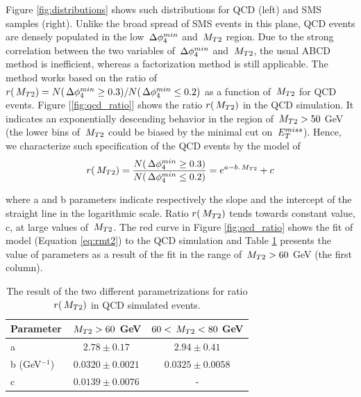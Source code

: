 Figure \ref{fig:distributions} shows such distributions for QCD (left) and SMS samples (right).
Unlike the broad spread of SMS events in this plane, QCD events are densely populated 
in the low $\,{\Delta\phi_{4}^{min}}$ and $\,{M_{T2}}$ region.
Due to the strong correlation between the two variables of $\,{\Delta\phi_{4}^{min}}$ and $\,{M_{T2}}$, 
the usual ABCD method is inefficient, whereas a factorization method \cite{MT2_2011} is still applicable.
The method works based on the ratio of $r(\,{M_{T2}}) = N (\,{\Delta\phi_{4}^{min}} \geq 0.3)/N (\,{\Delta\phi_{4}^{min}} \leq 0.2)$ 
as a function of $\,{M_{T2}}$ for QCD events. Figure [\ref{fig:qcd_ratio}] shows the ratio $r(\,{M_{T2}})$ in the QCD simulation. 
It indicates an exponentially descending behavior
in the region of $\,{M_{T2}} > 50$ GeV (the lower bins of $\,{M_{T2}}$ could be biased by the minimal cut on $\,{E_T^{miss}}$). 
Hence, we characterize such specification of the QCD events by the model 
of 
\begin{align}\label{eq:rmt2}
 r(\,{M_{T2}}) = \frac{N(\,{\Delta\phi_{4}^{min}} \geq 0.3)}{N(\,{\Delta\phi_{4}^{min}} \leq 0.2)} = e^{a-b.\,{M_{T2}}}+c
\end{align}

where a and b parameters indicate respectively the slope and the intercept of the straight line
 in the logarithmic scale. 
Ratio $r(\,{M_{T2}})$
tends towards 
constant value, c, at large values of $\,{M_{T2}}$.
The red curve in Figure \ref{fig:qcd_ratio} shows the fit of model (Equation \ref{eq:rmt2}) to the QCD simulation and 
Table \ref{tab:qcd_fit} presents the value of parameters as a result of the fit in the range of $\,{M_{T2}} > 60$ GeV (the first column). 

\begin{linenomath}
\begin{table}[h]
\begin{center}
\small
\begin{tabular}{l|cc}\hline\hline
Parameter & $\,{M_{T2}} > 60$ GeV & $60 < \,{M_{T2}} < 80$ GeV \\ \hline
a & $2.78\pm0.17$ & $2.94\pm0.41$ \\
b (GeV$^{-1}$) & $0.0320\pm0.0021$ & $0.0325\pm0.0058$ \\
c & $0.0139\pm0.0076$ & - \\ \hline\hline
\end{tabular}
\caption[Fit results for QCD]{The result of the two different parametrizations for ratio $r(\,{M_{T2}})$ in QCD simulated events.}  
\label{tab:qcd_fit}
\end{center}
\end{table}
\end{linenomath}


